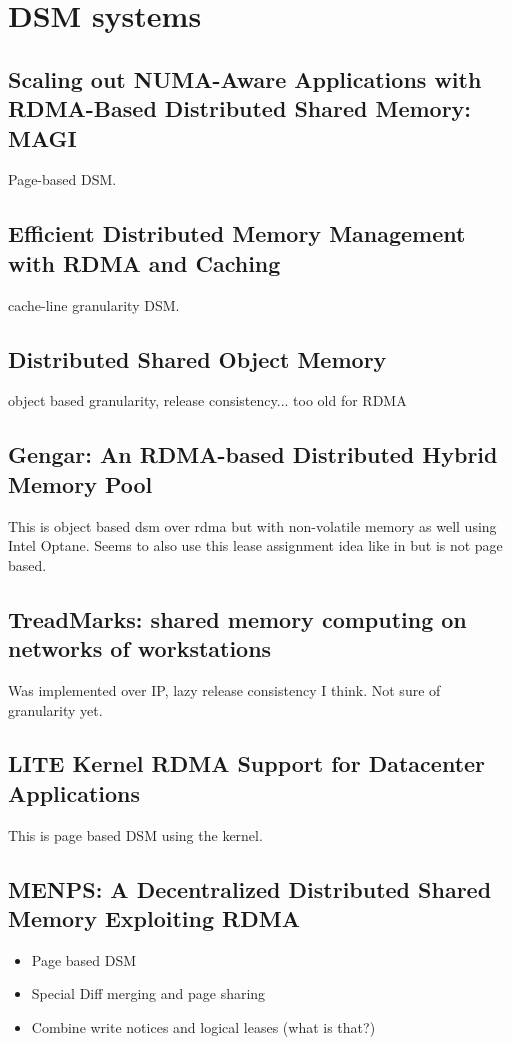 \documentclass[sigplan,nonacm]{acmart}
\begin{document}
\section {DSM systems}

    \subsection{Scaling out NUMA-Aware Applications with RDMA-Based Distributed Shared Memory: MAGI}
    Page-based DSM. \cite{Hong-JCST-2019}

    \subsection{Efficient Distributed Memory Management with RDMA and Caching }
    cache-line granularity DSM.\cite{Cai-VLDB-2018}

    \subsection{Distributed Shared Object Memory}
    object based granularity, release consistency... too old for RDMA\cite{Guedes-WWOSIII-1993}

    \subsection{Gengar: An RDMA-based Distributed Hybrid Memory Pool}
    This is object based dsm over rdma but with non-volatile memory as well using Intel Optane. Seems to 
    also use this lease assignment idea like in \cite{Endo-IPDRM-2020} but is not page based.\cite{Duan-ICDCS-2021}

    \subsection{TreadMarks: shared memory computing on networks of workstations}
    Was implemented over IP, lazy release consistency I think. Not sure of granularity yet.\cite{Amza-Usenix-1994}

    \subsection{LITE Kernel RDMA Support for Datacenter Applications}
    This is page based DSM using the kernel. \cite{Tsai-SOSP-2017}

    \subsection{MENPS: A Decentralized Distributed Shared Memory Exploiting RDMA}
        \begin{itemize}
            \item Page based DSM
            \item Special Diff merging and page sharing
            \item Combine write notices and logical leases (what is that?)\cite{Endo-IPDRM-2020}
        \end{itemize}
\end{document}
